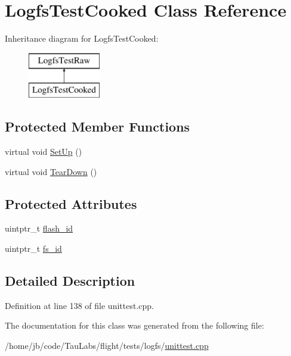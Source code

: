 \hypertarget{class_logfs_test_cooked}{\section{\-Logfs\-Test\-Cooked \-Class \-Reference}
\label{class_logfs_test_cooked}
}
\-Inheritance diagram for \-Logfs\-Test\-Cooked\-:\begin{figure}[H]
\begin{center}
\leavevmode
\includegraphics[height=2.000000cm]{class_logfs_test_cooked}
\end{center}
\end{figure}
\subsection*{\-Protected \-Member \-Functions}
\begin{DoxyCompactItemize}
\item 
virtual void \hyperlink{group___unit_tests_gafefb90c56c5d60e99e716775a5e60028}{\-Set\-Up} ()
\item 
virtual void \hyperlink{group___unit_tests_gab1ca9799c18f4944962a0e5b88ca8c9d}{\-Tear\-Down} ()
\end{DoxyCompactItemize}
\subsection*{\-Protected \-Attributes}
\begin{DoxyCompactItemize}
\item 
uintptr\-\_\-t \hyperlink{group___unit_tests_ga1180d0088fd85cca978eaed59163f626}{flash\-\_\-id}
\item 
uintptr\-\_\-t \hyperlink{group___unit_tests_gaa47f085754c3a15dd69bcfbde0d804d7}{fs\-\_\-id}
\end{DoxyCompactItemize}


\subsection{\-Detailed \-Description}


\-Definition at line 138 of file unittest.\-cpp.



\-The documentation for this class was generated from the following file\-:\begin{DoxyCompactItemize}
\item 
/home/jb/code/\-Tau\-Labs/flight/tests/logfs/\hyperlink{logfs_2unittest_8cpp}{unittest.\-cpp}\end{DoxyCompactItemize}
